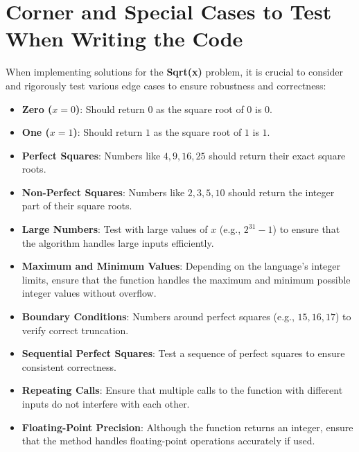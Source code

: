\section*{Corner and Special Cases to Test When Writing the Code}

When implementing solutions for the \textbf{Sqrt(x)} problem, it is crucial to consider and rigorously test various edge cases to ensure robustness and correctness:

\begin{itemize}
    \item \textbf{Zero (\(x = 0\))}: Should return \(0\) as the square root of \(0\) is \(0\).
    
    \item \textbf{One (\(x = 1\))}: Should return \(1\) as the square root of \(1\) is \(1\).
    
    \item \textbf{Perfect Squares}: Numbers like \(4, 9, 16, 25\) should return their exact square roots.
    
    \item \textbf{Non-Perfect Squares}: Numbers like \(2, 3, 5, 10\) should return the integer part of their square roots.
    
    \item \textbf{Large Numbers}: Test with large values of \(x\) (e.g., \(2^{31} - 1\)) to ensure that the algorithm handles large inputs efficiently.
    
    \item \textbf{Maximum and Minimum Values}: Depending on the language's integer limits, ensure that the function handles the maximum and minimum possible integer values without overflow.
    
    \item \textbf{Boundary Conditions}: Numbers around perfect squares (e.g., \(15, 16, 17\)) to verify correct truncation.
    
    \item \textbf{Sequential Perfect Squares}: Test a sequence of perfect squares to ensure consistent correctness.
    
    \item \textbf{Repeating Calls}: Ensure that multiple calls to the function with different inputs do not interfere with each other.
    
    \item \textbf{Floating-Point Precision}: Although the function returns an integer, ensure that the method handles floating-point operations accurately if used.
\end{itemize}

